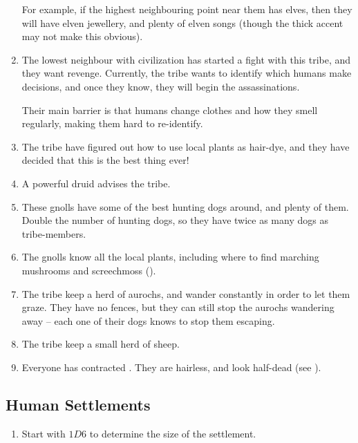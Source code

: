 \begin{multicols}{2}
\begin{enumerate}
  For example, if the highest neighbouring point near them has elves, then they will have elven jewellery, and plenty of elven songs (though the thick accent may not make this obvious).
  \item
  The lowest neighbour with civilization has started a fight with this tribe, and they want revenge.
  Currently, the tribe wants to identify which humans make decisions, and once they know, they will begin the assassinations.

  Their main barrier is that humans change clothes and how they smell regularly, making them hard to re-identify.
  \item
  The tribe have figured out how to use local plants as hair-dye, and they have decided that this is the best thing ever!
  \item
  A powerful druid advises the tribe.
  \item
  These gnolls have some of the best hunting dogs around, and plenty of them.
  Double the number of hunting dogs, so they have twice as many dogs as tribe-members.
  \item
  The gnolls know all the local plants, including where to find marching mushrooms and screechmoss ().
  \item
  The tribe keep a herd of aurochs, and wander constantly in order to let them graze.
  They have no fences, but they can still stop the aurochs wandering away -- each one of their dogs knows to stop them escaping.
  \item
  The tribe keep a small herd of sheep.
  \item
  Everyone has contracted .
  They are hairless, and look half-dead
  (see ).
\end{enumerate}


\subsection{Human Settlements}

\begin{enumerate}
  \item
  Start with $1D6$ to determine the size of the settlement.
\end{enumerate}
\end{multicols}

